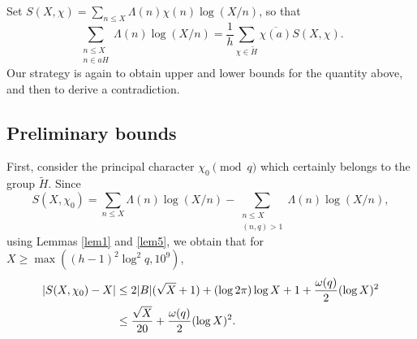 \documentclass [12pt]{amsart}
\numberwithin{equation}{section}
\begin{document}
Set $S(X, \chi) = \sum_{n\le X} \Lambda(n) \chi(n) \log (X/n)$, 
 so that 
\begin{equation} 
\label{eqnnew1} 
\sum_{\substack{n\le X \\ n\in aH }} \Lambda(n) \log (X/n)  = \frac 1h \sum_{\chi \in \tilde H} 
\overline{\chi(a)} S(X,\chi).
\end{equation}
Our strategy is again to obtain upper and lower bounds for the quantity above, 
and then to derive a contradiction.

\subsection{Preliminary bounds}
 
First, consider the principal character $\chi_0 \pmod q$ which 
certainly belongs to the group $\tilde H$.  Since 
$$ 
 S(X,\chi_0) = \sum_{n\le X} \Lambda(n) \log (X/n) - 
 \sum_{\substack{n\le X \\ (n,q)>1} } \Lambda(n) \log (X/n), 
$$ 
using Lemmas \ref{lem1} and \ref{lem5}, we obtain that for $X\ge \max((h-1)^2\log^2 q, 10^9)$,
\begin{align}\label{eqnAPlem1}
|S(X, \chi_0) - X| &\leq 2|B|(\sqrt{X}+1) + (\log 2\pi)\log X + 1 + \frac{\omega(q)}{2} (\log X)^2\notag\\
&\le \frac{\sqrt{X}}{20} +\frac{\omega(q)}{2}(\log X)^2.
\end{align}  
\end{document}
